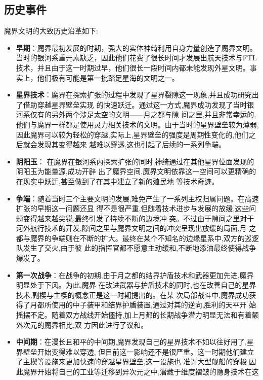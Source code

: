 \documentclass[10.5pt,compsoc,UTF8]{CjC}
\theoremstyle{mystyle}
\begin{document}
{\subsection{\color{gray}历史事件}

魔界文明的大致历史沿革如下:
\begin{itemize}
	\item \textbf{早期}：魔界最初发展的时期，强大的实体神绮利用自身力量创造了魔界文明。当时的银河系重元素缺乏，因此他们花费了很长时间才发展出航天技术与FTL技术，并且由于这一时期过早，他们很长一段时间内都未能发现外星文明。事实上，他们极有可能是第一批踏足星海的文明之一。
	\item \textbf{星界技术}：魔界在探索扩张的过程中发现了星界裂隙这一现象,并且成功研究出了借助穿越星界壁垒实现
	的快速跃迁。通过这一方式,魔界成功发现了当时银河系仅有的另外两个涉足太空的文明——月之都与隙
	间之里,并且非常幸运的,他们与魔界一样都是使用灵力相关技术的文明。由于当时的星界壁垒较为薄弱,
	因此魔界可以较为轻松的穿越,实际上,星界壁垒的强度是周期性变化的,他们之后就会发现其变得越来
	越难以穿透,这也引起了后续的一系列争端。
	\item \textbf{阴阳玉}： 在魔界在银河系内探索扩张的同时,神绮通过在其他星界位面发现的阴阳玉为能量源,成功开辟
	出了魔界空间,魔界文明依靠这一空间可以更精确的在现实中跃迁,甚至做到了在其中建立了新的殖民地
	等技术奇迹。
	\item \textbf{争端}：随着当时三个主要文明的发展,难免产生了一系列主权归属问题。在高速扩张的早期这一问题还显
	得不是很严重,但随着技术进步与发展的放缓,这些问题变得越来越尖锐,最终引发了持续不断的边境冲
	突。不过由于隙间之里对于河外航行技术的开发,隙间之里与魔界文明之间的冲突呈现出放缓的局面,月
	之都与魔界的争端则在不断的扩大。最终在某个不知名的边缘星系中,双方的巡逻队发生了交火,由于彼
	此的指挥官都不愿意主动缓和,不断地添油最终使得战争爆发了。
	\item \textbf{第一次战争}：在战争的初期,由于月之都的结界护盾技术和武器更加先进,魔界明显处于下风。为此,魔界
	在改进武器与护盾技术的同时,也在改善自己的星界技术,副楔与主楔的概念正是这一时期提出的。在某
	次局部战斗中,魔界成功获得了月都所使用的中子装甲和结界护盾装置,通过对其的逆向,胜利的天平开
	始摇摆不定。随着双方战线开始僵持,加上月都的长期战争潜力明显无法和有着额外次元的魔界相比,双
	方因此进行了议和。
	\item \textbf{中间期}：在漫长且和平的中间期,魔界发现自己的星界技术不如以往好用了,星界壁垒开始变得难以穿透,
	但目前这一影响还不是很严重。这一时期他们建立了主楔等设施来更加快速的穿越星界壁垒,这一设施也
	准许大型舰船的穿梭,因此魔界开始将自己的工业等迁移到异次元之中,潜藏于维度褶皱的隐身技术在这

\end{itemize}}
\end{document}
